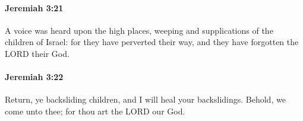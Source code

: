 		\paragraph{Jeremiah 3:21} %
			\label{JEREMIAH-3-21}

			A voice was heard upon the high places, weeping and supplications of the children of Israel: for they have perverted their way, and they have forgotten the LORD their God.


		\paragraph{Jeremiah 3:22} %
			\label{JEREMIAH-3-22}

			Return, ye backsliding children, and I will heal your backslidings. Behold, we come unto thee; for thou art the LORD our God.


